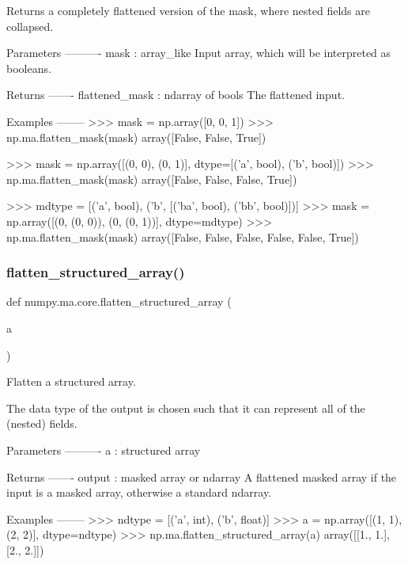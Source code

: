 \begin{DoxyVerb}Returns a completely flattened version of the mask, where nested fields
are collapsed.

Parameters
----------
mask : array_like
    Input array, which will be interpreted as booleans.

Returns
-------
flattened_mask : ndarray of bools
    The flattened input.

Examples
--------
>>> mask = np.array([0, 0, 1])
>>> np.ma.flatten_mask(mask)
array([False, False,  True])

>>> mask = np.array([(0, 0), (0, 1)], dtype=[('a', bool), ('b', bool)])
>>> np.ma.flatten_mask(mask)
array([False, False, False,  True])

>>> mdtype = [('a', bool), ('b', [('ba', bool), ('bb', bool)])]
>>> mask = np.array([(0, (0, 0)), (0, (0, 1))], dtype=mdtype)
>>> np.ma.flatten_mask(mask)
array([False, False, False, False, False,  True])\end{DoxyVerb}
 \mbox{\label{namespacenumpy_1_1ma_1_1core_aab33bfa37f11550add6d197bce6c1ecb}} 
\subsubsection{\texorpdfstring{flatten\+\_\+structured\+\_\+array()}{flatten\_structured\_array()}}
{\footnotesize\ttfamily def numpy.\+ma.\+core.\+flatten\+\_\+structured\+\_\+array (\begin{DoxyParamCaption}\item[{}]{a }\end{DoxyParamCaption})}

\begin{DoxyVerb}Flatten a structured array.

The data type of the output is chosen such that it can represent all of the
(nested) fields.

Parameters
----------
a : structured array

Returns
-------
output : masked array or ndarray
    A flattened masked array if the input is a masked array, otherwise a
    standard ndarray.

Examples
--------
>>> ndtype = [('a', int), ('b', float)]
>>> a = np.array([(1, 1), (2, 2)], dtype=ndtype)
>>> np.ma.flatten_structured_array(a)
array([[1., 1.],
       [2., 2.]])\end{DoxyVerb}
 \mbox{\label{namespacenumpy_1_1ma_1_1core_a24f4854b6004a1420f5c71dd02d22ba1}} 
